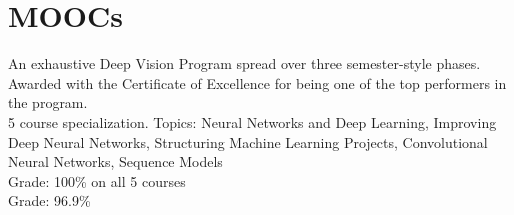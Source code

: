 
\section{MOOCs}
An exhaustive Deep Vision Program spread over three semester-style phases. \\
Awarded with the Certificate of Excellence for being one of the top performers in the program. \\
\vspace{3pt}
5 course specialization. Topics: Neural Networks and Deep Learning, Improving Deep Neural Networks, Structuring Machine Learning Projects, Convolutional Neural Networks, Sequence Models \\
Grade: 100\% on all 5 courses \\
\vspace{3pt}
Grade: 96.9\% \\
\sectionsep